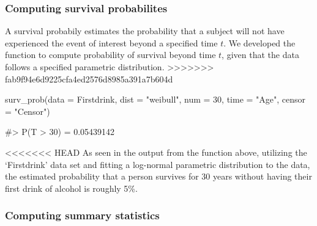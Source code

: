 \hypertarget{computing-survival-probabilites-1}{%
\subsubsection{Computing survival
probabilites}\label{computing-survival-probabilites-1}}

A survival probabily estimates the probability that a subject will not
have experienced the event of interest beyond a specified time \(t\). We
developed the function  to compute probability of
survival beyond time \(t\), given that the data follows a specified
parametric distribution.
\textgreater{}\textgreater{}\textgreater{}\textgreater{}\textgreater{}\textgreater{}\textgreater{}
fab9f94e6d9225cfa4ed2576d8985a391a7b604d

\begin{Schunk}
\begin{Sinput}
surv_prob(data = Firstdrink, dist = "weibull", num = 30, time = "Age", censor = "Censor")
\end{Sinput}
\begin{Soutput}
#> P(T > 30) = 0.05439142
\end{Soutput}
\end{Schunk}

\textless{}\textless{}\textless{}\textless{}\textless{}\textless{}\textless{}
HEAD As seen in the output from the function above, utilizing the
`Firstdrink' data set and fitting a log-normal parametric distribution
to the data, the estimated probability that a person survives for 30
years without having their first drink of alcohol is roughly 5\%.

\hypertarget{computing-summary-statistics}{%
\subsubsection{Computing summary
statistics}\label{computing-summary-statistics}}


